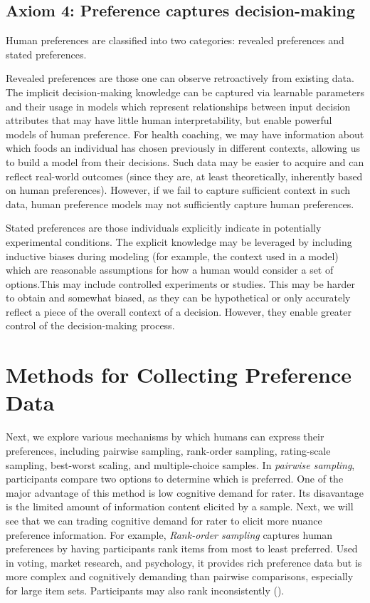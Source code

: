 \documentclass[
  letterpaper,
  numbers=noenddot,
  DIV=11]{scrreprt}
\theoremstyle{definition}
\theoremstyle{plain}
\theoremstyle{plain}
\theoremstyle{remark}
\begin{document}
\subsection*{Axiom 4: Preference captures
decision-making}\label{axiom-2-preference-captures-decision-making}

Human preferences are classified into two categories: revealed
preferences and stated preferences.

Revealed preferences are those one can observe retroactively from
existing data. The implicit decision-making knowledge can be captured
via learnable parameters and their usage in models which represent
relationships between input decision attributes that may have little
human interpretability, but enable powerful models of human preference.
For health coaching, we may have information about which foods an
individual has chosen previously in different contexts, allowing us to
build a model from their decisions. Such data may be easier to acquire
and can reflect real-world outcomes (since they are, at least
theoretically, inherently based on human preferences). However, if we
fail to capture sufficient context in such data, human preference models
may not sufficiently capture human preferences.

Stated preferences are those individuals explicitly indicate in
potentially experimental conditions. The explicit knowledge may be
leveraged by including inductive biases during modeling (for example,
the context used in a model) which are reasonable assumptions for how a
human would consider a set of options.This may include controlled
experiments or studies. This may be harder to obtain and somewhat
biased, as they can be hypothetical or only accurately reflect a piece
of the overall context of a decision. However, they enable greater
control of the decision-making process.

\section{Methods for Collecting Preference Data}\label{sec-collect}

Next, we explore various mechanisms by which humans can express their
preferences, including pairwise sampling, rank-order sampling,
rating-scale sampling, best-worst scaling, and multiple-choice samples.
In \emph{pairwise sampling}, participants compare two options to
determine which is preferred. One of the major advantage of this method
is low cognitive demand for rater. Its disavantage is the limited amount
of information content elicited by a sample. Next, we will see that we
can trading cognitive demand for rater to elicit more nuance preference
information. For example, \emph{Rank-order sampling} captures human
preferences by having participants rank items from most to least
preferred. Used in voting, market research, and psychology, it provides
rich preference data but is more complex and cognitively demanding than
pairwise comparisons, especially for large item sets. Participants may
also rank inconsistently ().
\end{document}
